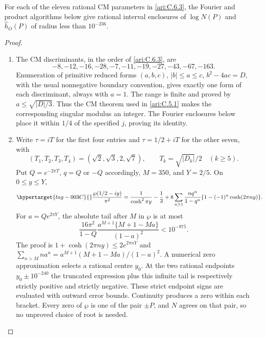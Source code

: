 \begin{proposition}\hypertarget{tag-000Z}{}\label{ari:C.6.5}

For each of the eleven rational CM parameters in \cref{ari:C.6.3},
the Fourier and product algorithms below give rational interval
enclosures of $\log N(P)$ and $\widehat h_O(P)$ of radius less
than $10^{-236}$.
\end{proposition}


\begin{proof}
\begin{enumerate}[label=\arabic*.,leftmargin=*]
\item The CM discriminants, in the order of \ref{ari:C.6.3}, are
\[
 -8,-12,-16,-28,-7,-11,-19,-27,-43,-67,-163.
\]
Enumeration of primitive reduced forms
$(a,b,c)$, $|b|\le a\le c$, $b^2-4ac=D$, with the usual
nonnegative boundary convention, gives exactly one form of
each discriminant, always with $a=1$.
The range is finite and proved by $a\le\sqrt{|D|/3}$.
Thus the CM theorem used in \ref{ari:C.5.1} makes the corresponding
singular modulus an integer. The Fourier enclosures below
place it within $1/4$ of the specified $j$, proving its
identity. 

\item Write $\tau=iT$ for the first four entries and
$\tau=1/2+iT$ for the other seven, with
\[
 (T_1,T_2,T_3,T_4)=(\sqrt2,\sqrt3,2,\sqrt7),\qquad
 T_k=\sqrt{|D_k|}/2\quad(k\ge5).
\]
Put $Q=e^{-2\pi T}$, $q=Q$ or $-Q$ accordingly,
$M=350$, and $Y=2/5$. On $0\le y\le Y$,
\begin{equation}\hypertarget{tag-003C}{}\label{ari:eq:ch-wp-bracket}
 \frac{\wp(1/2-iy)}{\pi^2}
 =\frac1{\cosh^2\pi y}-\frac13+
 8\sum_{n\ge1}\frac{nq^n}{1-q^n}
                 \{1-(-1)^n\cosh(2\pi ny)\}.
\end{equation}
For $a=Qe^{2\pi Y}$, the absolute tail after $M$ in
$\wp$ is at most
\[
 \frac{16\pi^2}{1-Q}
 \frac{a^{M+1}\{M+1-Ma\}}{(1-a)^2}<10^{-875}.
\]
The proof is $1+\cosh(2\pi ny)\le2e^{2\pi nY}$ and
$\sum_{n>M}na^n=a^{M+1}(M+1-Ma)/(1-a)^2$.
A numerical zero approximation selects a rational centre $y_0$. At the two rational endpoints
$y_0\pm10^{-240}$ the truncated expression plus this
infinite tail is respectively strictly positive and strictly
negative. These strict endpoint signs are evaluated with outward error bounds.
Continuity produces a zero within each bracket. Every zero
of $\wp$ is one of the pair $\pm P$, and $N$ agrees on
that pair, so no unproved choice of root is needed.


\end{enumerate}
\end{proof}
